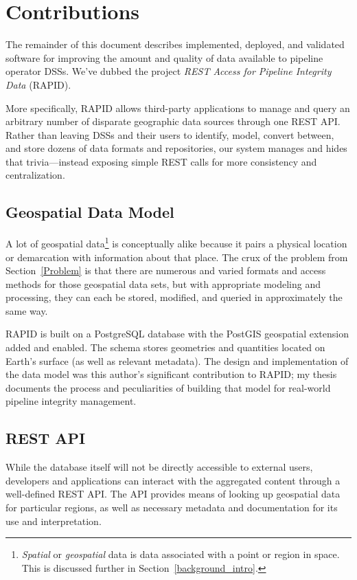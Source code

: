 \section{Contributions}
The remainder of this document describes implemented, deployed, and validated software for improving the amount and quality of data available to pipeline operator DSSs. We've dubbed the project \textit{REST Access for Pipeline Integrity Data} (RAPID).

More specifically, RAPID allows third-party applications to manage and query an arbitrary number of disparate geographic data sources through one REST API. Rather than leaving DSSs and their users to identify, model, convert between, and store dozens of data formats and repositories, our system manages and hides that trivia---instead exposing simple REST calls for more consistency and centralization.

\subsection{Geospatial Data Model}
A lot of geospatial data\footnote{\textit{Spatial} or \textit{geospatial} data is data associated with a point or region in space. This is discussed further in Section~\ref{background_intro}.} is conceptually alike because it pairs a physical location or demarcation with information about that place. The crux of the problem from Section~\ref{Problem} is that there are numerous and varied formats and access methods for those geospatial data sets, but with appropriate modeling and processing, they can each be stored, modified, and queried in approximately the same way.

RAPID is built on a PostgreSQL database with the PostGIS geospatial extension added and enabled. The schema stores geometries and quantities located on Earth's surface (as well as relevant metadata). The design and implementation of the data model was this author's significant contribution to RAPID; my thesis documents the process and peculiarities of building that model for real-world pipeline integrity management.

\subsection{REST API}
While the database itself will not be directly accessible to external users, developers and applications can interact with the aggregated content through a well-defined REST API. The API provides means of looking up geospatial data for particular regions, as well as necessary metadata and documentation for its use and interpretation.

